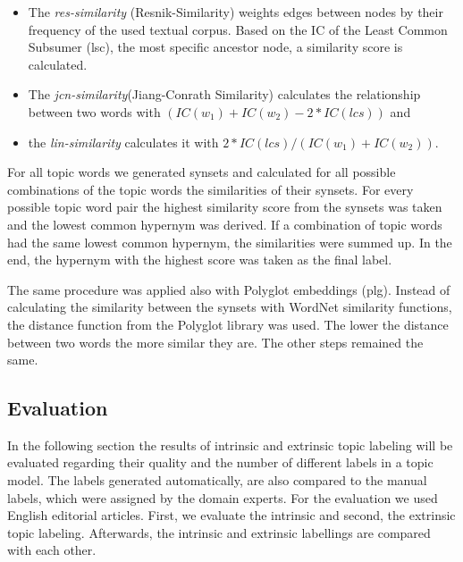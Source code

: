 {\begin{itemize}
\item The \textit{res-similarity} (Resnik-Similarity) weights edges between nodes by their frequency of the used textual corpus. Based on the \ac{IC} of the Least Common Subsumer (lsc), the most specific ancestor node, a similarity score is calculated.
\item The \textit{jcn-similarity}(Jiang-Conrath Similarity) calculates the relationship between two words with $(IC(w_{1}) + IC(w_{2}) - 2 * IC(lcs))$ and \item the \textit{lin-similarity} calculates it with $2 * IC(lcs) / (IC(w_{1}) + IC(w_{2}))$.
\end{itemize}

For all topic words we generated synsets and calculated for all possible combinations of the topic words the similarities of their synsets. For every possible topic word pair the highest similarity score from the synsets was taken and the lowest common hypernym was derived. If a combination of topic words had the same lowest common hypernym, the similarities were summed up. In the end, the hypernym with the highest score was taken as the final label. 

The same procedure was applied also with Polyglot embeddings (plg). Instead of calculating the similarity between the synsets with WordNet similarity functions, the distance function from the Polyglot library was used. The lower the distance between two words the more similar they are. The other steps remained the same.

\subsection{Evaluation}
In the following section the results of intrinsic and extrinsic topic labeling will be evaluated regarding their quality and the number of different labels in a topic model. The labels generated automatically, are also compared to the manual labels, which were assigned by the domain experts. For the evaluation we used English editorial articles. First, we evaluate the intrinsic and second, the extrinsic topic labeling. Afterwards, the intrinsic and extrinsic labellings are compared with each other. 

}
